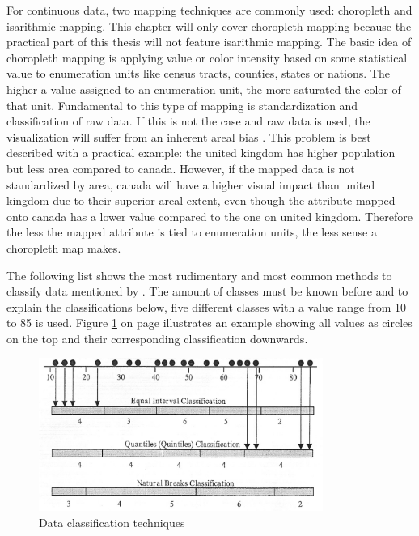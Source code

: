 For continuous data, two mapping techniques are commonly used: choropleth and isarithmic mapping. This chapter will only cover choropleth mapping because the practical part of this thesis will not feature isarithmic mapping. The basic idea of choropleth mapping is applying value or color intensity based on some statistical value to enumeration units like census tracts, counties, states or nations. The higher a value assigned to an enumeration unit, the more saturated the color of that unit. Fundamental to this type of mapping is standardization and classification of raw data. If this is not the case and raw data is used, the visualization will suffer from an inherent areal bias . This problem is best described with a practical example: the united kingdom has higher population but less area compared to canada. However, if the mapped data is not standardized by area, canada will have a higher visual impact than united kingdom due to their superior areal extent, even though the attribute mapped onto canada has a lower value compared to the one on united kingdom. Therefore the less the mapped attribute is tied to enumeration units, the less sense a choropleth map makes.

The following list shows the most rudimentary and most common methods to classify data mentioned by \citeauthor{McMaster2010}. The amount of classes must be known before and to explain the classifications below, five different classes with a value range from 10 to 85 is used. Figure \ref{fig:choropleth-classification} on page \pageref{fig:choropleth-classification} illustrates an example showing all values as circles on the top and their corresponding classification downwards.

\begin{figure}[!htb]
\centering
\includegraphics[height=5cm,keepaspectratio]{images/choropleth/classification.png}
\caption[
    Data classification techniques .
]{Data classification techniques}
\label{fig:choropleth-classification}
\end{figure}

